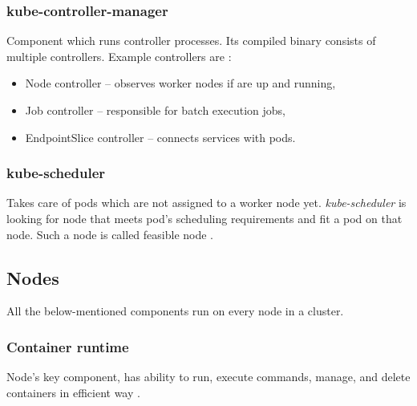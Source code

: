 
\subsubsection{kube-controller-manager}
\label{sec:kubeControllerManager}

Component which runs controller processes. Its compiled binary consists of multiple controllers. Example controllers are \cite{KubernetesDocs}:

\begin{itemize}
    \item Node controller -- observes worker nodes if are up and running,
    \item Job controller -- responsible for batch execution jobs,
    \item EndpointSlice controller -- connects services with pods.
\end{itemize}


\subsubsection{kube-scheduler}
\label{sec:kubeScheduler}

Takes care of pods which are not assigned to a worker node yet. \textit{kube-scheduler} is looking for node that meets pod's scheduling requirements and fit a pod on that node. Such a node is called feasible node \cite{KubernetesDocs}.


\subsection{Nodes}
\label{sec:k8sNodes}
All the below-mentioned components run on every node in a cluster.

\subsubsection{Container runtime}
\label{sec:containerRuntime}

Node's key component, has ability to run, execute commands, manage, and delete containers in efficient way \cite{KubernetesDocs}. 

